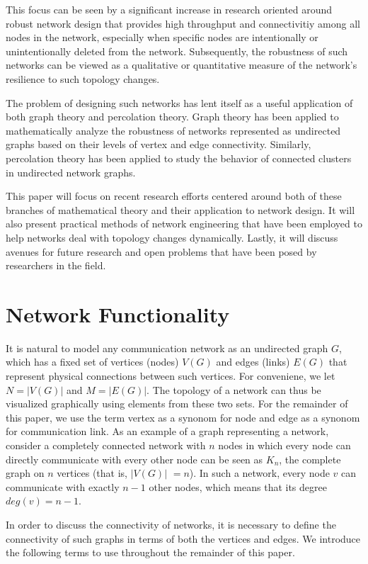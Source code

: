 \documentclass[11pt]{article}
\begin{document}
This focus can be seen by a significant increase in research oriented around robust network design that provides high throughput and connectivitiy among all nodes in the network, especially when specific nodes are intentionally or unintentionally deleted from the network. Subsequently, the robustness of such networks can be viewed as a qualitative or quantitative measure of the network's resilience to such topology changes.

The problem of designing such networks has lent itself as a useful application of both graph theory and percolation theory. Graph theory has been applied to mathematically analyze the robustness of networks represented as undirected graphs based on their levels of vertex and edge connectivity. Similarly, percolation theory has been applied to study the behavior of connected clusters in undirected network graphs. 

This paper will focus on recent research efforts centered around both of these branches of 
mathematical theory and their application to network design. It will also present practical methods of
network engineering that have been employed to help networks deal with topology changes dynamically.
Lastly, it will discuss avenues for future research and open problems that have been posed by 
researchers in the field.

\section{Network Functionality}
\label{Definitions}

It is natural to model any communication network as an undirected graph $G$, which has a fixed 
set of vertices (nodes) $V(G)$ and edges (links) $E(G)$ that represent physical connections between such vertices. For conveniene, we let $N = |V(G)|$ and $M = |E(G)|$. The topology of a network
can thus be visualized graphically using elements from these two sets. For the remainder of this paper,
we use the term vertex as a synonom for node and edge as a synonom for communication link. As an example of a graph representing a network, consider a completely connected network with $n$ nodes in which every node can directly communicate with every other 
node can be seen as $K_{n}$, the complete graph on $n$ vertices (that is, $|V(G)|$ $= n$). In such a network, every node $v$ can
communicate with exactly $n-1$ other nodes, which means that its degree $deg(v) = n-1$. 

In order to discuss the connectivity of networks, it is necessary to define the connectivity of such
graphs in terms of both the vertices and edges. We introduce the following terms to use throughout 
the remainder of this paper.
\end{document}
